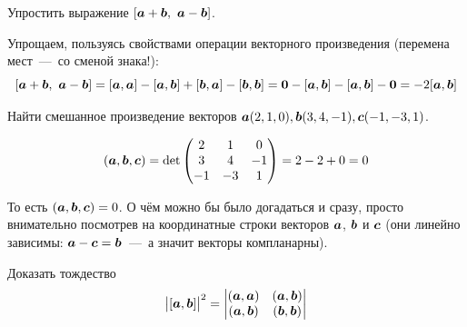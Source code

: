 \documentclass[a4paper,12pt]{article}
\begin{document}
  
  \begin{problem}[3.2(1)]
    Упростить выражение $[\bds a + \bds b,\ \bds a - \bds b]$.
  \end{problem}
  
  \begin{solution}
    Упрощаем, пользуясь свойствами операции векторного произведения (перемена мест~---~со сменой знака!):
    \[
      [\boldsymbol a + \boldsymbol b,\ \boldsymbol a - \boldsymbol b] = [\boldsymbol a, \boldsymbol a] - [\boldsymbol a, \boldsymbol b] + [\boldsymbol b, \boldsymbol a] - [\boldsymbol b, \boldsymbol b]
        = \boldsymbol 0 - [\boldsymbol a, \boldsymbol b] - [\boldsymbol a, \boldsymbol b] - \boldsymbol 0
        = -2 [\boldsymbol a, \boldsymbol b]
    \]
  \end{solution}
  
  
  \begin{problem}[3.19(3)]
    Найти смешанное произведение векторов $\boldsymbol a(2, 1, 0), \boldsymbol b(3, 4, -1), \boldsymbol c(-1, -3, 1)$.
  \end{problem}

  \begin{solution}
    \[
      (\boldsymbol a, \boldsymbol b, \boldsymbol c) = \det\begin{pmatrix}
        2 & 1 & 0\\
        3 & 4 & -1\\
        -1 & -3 & 1
      \end{pmatrix}
      = 2 - 2 + 0 = 0
    \]
    
    То есть $(\bds a, \bds b, \bds c) \hm= 0$.
    О чём можно бы было догадаться и сразу, просто внимательно посмотрев на координатные строки векторов $\boldsymbol a$, $\boldsymbol b$ и $\boldsymbol c$ (они линейно зависимы: $\bds a \hm- \bds c \hm= \bds b$~---~а значит векторы компланарны).
  \end{solution}
  
  
  \begin{problem}[3.13(1)]
    Доказать тождество
    \[
      \bigl| [\boldsymbol a, \boldsymbol b] \bigr|^2 = \begin{vmatrix}
        (\boldsymbol a, \boldsymbol a) & (\boldsymbol a, \boldsymbol b)\\
        (\boldsymbol a, \boldsymbol b) & (\boldsymbol b, \boldsymbol b)
      \end{vmatrix}
    \]
  \end{problem}
  
\end{document}
